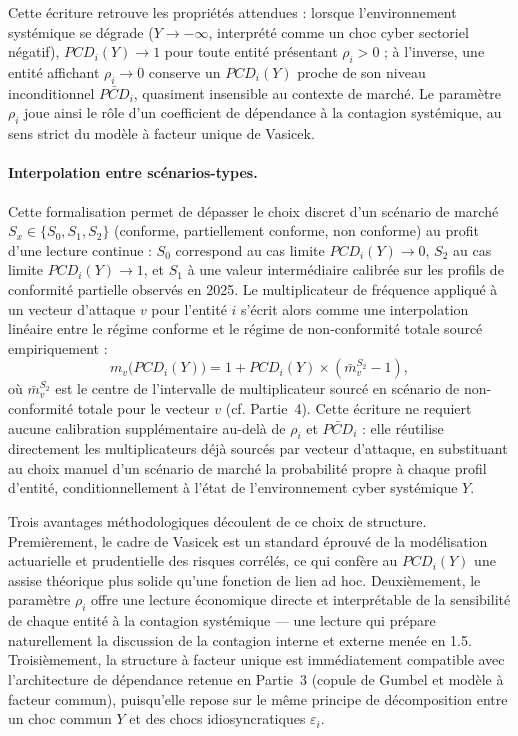 \documentclass[11pt,a4paper]{article}
\theoremstyle{navystyle}
\theoremstyle{navydef}
\begin{document}
Cette écriture retrouve les propriétés attendues : lorsque l'environnement
systémique se dégrade ($Y \to -\infty$, interprété comme un choc cyber
sectoriel négatif), $PCD_i(Y) \to 1$ pour toute entité présentant
$\rho_i > 0$ ; à l'inverse, une entité affichant $\rho_i \to 0$ conserve un
$PCD_i(Y)$ proche de son niveau inconditionnel $\bar{PCD}_i$, quasiment
insensible au contexte de marché. Le paramètre $\rho_i$ joue ainsi le rôle
d'un coefficient de dépendance à la contagion systémique, au sens strict du
modèle à facteur unique de Vasicek.

\paragraph{Interpolation entre scénarios-types.} Cette formalisation permet de
dépasser le choix discret d'un scénario de marché $S_x \in \{S_0, S_1, S_2\}$
(conforme, partiellement conforme, non conforme) au profit d'une lecture
continue : $S_0$ correspond au cas limite $PCD_i(Y) \to 0$, $S_2$ au cas
limite $PCD_i(Y) \to 1$, et $S_1$ à une valeur intermédiaire calibrée sur
les profils de conformité partielle observés en 2025. Le multiplicateur de
fréquence appliqué à un vecteur d'attaque $v$ pour l'entité $i$ s'écrit alors
comme une interpolation linéaire entre le régime conforme et le régime de
non-conformité totale sourcé empiriquement :
\begin{equation}
\label{eq:mv-interp}
m_v\bigl(PCD_i(Y)\bigr) = 1 + PCD_i(Y) \times \left(\bar{m}_v^{S_2} - 1\right),
\end{equation}
où $\bar{m}_v^{S_2}$ est le centre de l'intervalle de multiplicateur sourcé en
scénario de non-conformité totale pour le vecteur $v$ (cf. Partie~4). Cette
écriture ne requiert aucune calibration supplémentaire au-delà de $\rho_i$ et
$\bar{PCD}_i$ : elle réutilise directement les multiplicateurs déjà sourcés
par vecteur d'attaque, en substituant au choix manuel d'un scénario de marché
la probabilité propre à chaque profil d'entité, conditionnellement à l'état
de l'environnement cyber systémique $Y$.

Trois avantages méthodologiques découlent de ce choix de structure. Premièrement,
le cadre de Vasicek est un standard éprouvé de la modélisation actuarielle et
prudentielle des risques corrélés, ce qui confère au $PCD_i(Y)$ une
assise théorique plus solide qu'une fonction de lien ad hoc. Deuxièmement, le
paramètre $\rho_i$ offre une lecture économique directe et interprétable de
la sensibilité de chaque entité à la contagion systémique --- une lecture
qui prépare naturellement la discussion de la contagion interne et externe
menée en 1.5. Troisièmement, la structure à facteur unique est immédiatement
compatible avec l'architecture de dépendance retenue en Partie~3 (copule de
Gumbel et modèle à facteur commun), puisqu'elle repose sur le même principe
de décomposition entre un choc commun $Y$ et des chocs idiosyncratiques
$\varepsilon_i$.
\end{document}
